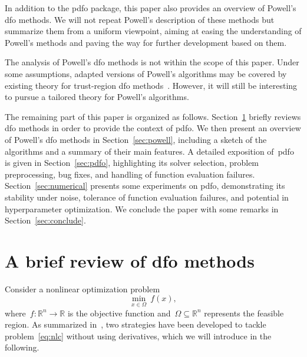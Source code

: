 \documentclass[manuscript,screen,review]{acmart}
\numberwithin{equation}{section}
\newcommand*{\R}{\mathbb{R}}
\newcommand*{\fset}{\Omega}
\newcommand*{\obj}{f}
\begin{document}
In addition to the \gls{pdfo} package, this paper also provides an overview of Powell's \gls{dfo} methods.
We will not repeat Powell's description of these methods but summarize them from a uniform viewpoint, aiming at easing the understanding of Powell's methods and paving the way for further development based on them.

The analysis of Powell's \gls{dfo} methods is not within the scope of this paper.
Under some assumptions, adapted versions of Powell's algorithms may be covered by existing theory for trust-region \gls{dfo} methods~\cite[Chapter~10]{Conn_Scheinberg_Vicente_2009b}.
However, it will still be interesting to pursue a tailored theory for Powell's algorithms.

The remaining part of this paper is organized as follows.
Section~\ref{sec:dfo} briefly reviews \gls{dfo} methods in order to provide the context of \gls{pdfo}.
We then present an overview of Powell's \gls{dfo} methods in Section~\ref{sec:powell}, including a sketch of the algorithms and a summary of their main features.
A detailed exposition of~\gls{pdfo} is given in Section~\ref{sec:pdfo}, highlighting its solver selection, problem preprocessing, bug fixes, and handling of function evaluation failures.
Section~\ref{sec:numerical} presents some experiments on \gls{pdfo}, demonstrating its stability under noise, tolerance of function evaluation failures, and potential in hyperparameter optimization.
We conclude the paper with some remarks in Section~\ref{sec:conclude}.

\section{A brief review of \gls{dfo} methods}
\label{sec:dfo}

Consider a nonlinear optimization problem
\begin{equation}
    \label{eq:nlc}
    \min_{x \in \fset} ~ \obj(x),
\end{equation}
where~$\obj : \R^n \to \R$ is the objective function and~$\fset \subseteq \R^n$ represents the feasible region.
As summarized in~\cite{Conn_Scheinberg_Vicente_2009b}, two strategies have been developed to tackle problem~\eqref{eq:nlc} without using derivatives, which we will introduce in the following.
\end{document}

